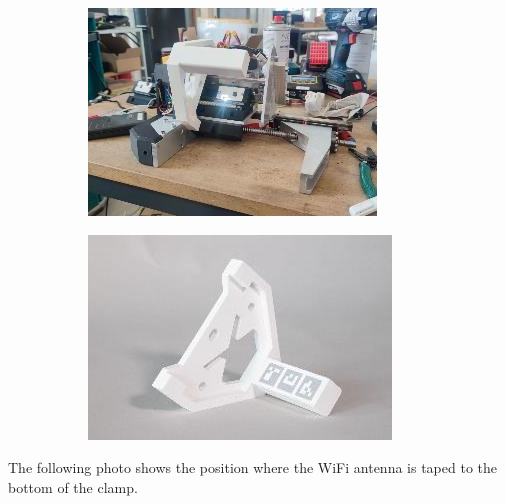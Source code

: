 \documentclass[11pt]{book}
\begin{document}
\begin{figure}[H]
\centering
\begin{subfigure}[b]{0.45\textwidth}
\centering
\includegraphics[width=\textwidth]{./images/image17.jpeg}
\end{subfigure}
\hfill
\begin{subfigure}[b]{0.45\textwidth}
\centering
\includegraphics[width=\textwidth]{./images/image18.jpeg}
\end{subfigure}
\end{figure}


The following photo shows the position where the WiFi antenna is taped to the bottom of the clamp.
\end{document}
